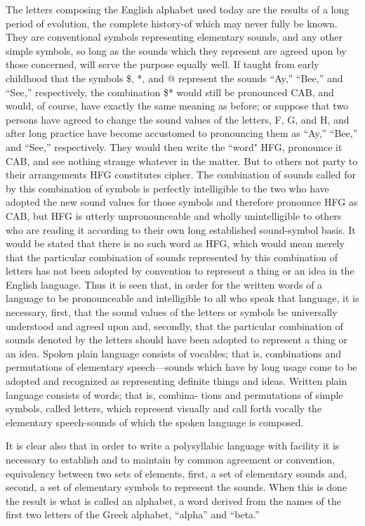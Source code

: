 \mypara The letters composing the English alphabet used today are the results
of a long period of evolution, the complete history-of which may never
fully be known. They are conventional symbols representing elementary
sounds, and any other simple symbols, so long as the sounds which they
represent are agreed upon by those concerned, will serve the purpose
equally well. If taught from early childhood that the symbols \$, *, and
@ represent the sounds “Ay,” “Bee,” and “See,” respectively, the
combination \@\$* would still be pronounced CAB, and would, of course,
have exactly the same meaning as before; or suppose that two persons
have agreed to change the sound values of the letters, F, G, and H, and
after long practice have become accustomed to pronouncing them as
“Ay,” “Bee,” and “See,” respectively. They would then write the “word"
HFG, pronounce it CAB, and see nothing strange whatever in the
matter. But to others not party to their arrangements HFG constitutes
cipher. The combination of sounds called for by this combination of symbols is perfectly intelligible to the two who have adopted the new sound
values for those symbols and therefore pronounce HFG as CAB, but
HFG is utterly unpronounceable and wholly unintelligible to others who
are reading it according to their own long established sound-symbol basis.
It would be stated that there is no such word as HFG, which would
mean merely that the particular combination of sounds represented by
this combination of letters has not been adopted by convention to represent a thing or an idea in the English language. Thus it is seen that, in
order for the written words of a language to be pronounceable and
intelligible to all who speak that language, it is necessary, ﬁrst, that the
sound values of the letters or symbols be universally understood and
agreed upon and, secondly, that the particular combination of sounds
denoted by the letters should have been adopted to represent a thing or
an idea. Spoken plain language consists of vocables; that is, combinations and permutations of elementary speech—sounds which have by long
usage come to be adopted and recognized as representing deﬁnite things
and ideas. Written plain language consists of words; that is, combina-
tions and permutations of simple symbols, called letters, which represent
visually and call forth vocally the elementary speech-sounds of which
the spoken language is composed.


\mypara It is clear also that in order to write a polysyllabic language with
facility it is necessary to establish and to maintain by common agreement
or convention, equivalency between two sets of elements, ﬁrst, a set of
elementary sounds and, second, a set of elementary symbols to represent the sounds. When this is done the result is what is called an alphabet,
a word derived from the names of the ﬁrst two letters of the Greek
alphabet, “alpha” and “beta.”

